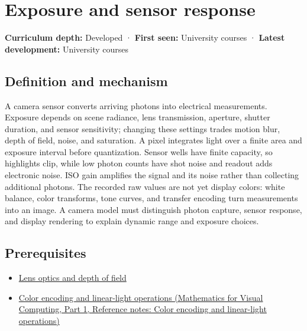 \hypertarget{appendix-92d45cdf2afc}{}\label{referencestart:appendix-92d45cdf2afc}
\section{Exposure and sensor response}\label{appendix-92d45cdf2afc-exposure-and-sensor-response}

\hypertarget{appendix-92d45cdf2afc-exposure-and-sensor-response}{}

\textbf{Curriculum depth:} Developed · \textbf{First seen:} University courses · \textbf{Latest development:} University courses

\begin{allmightroledefinition}

\subsection{Definition and mechanism}\label{appendix-92d45cdf2afc-definition-and-mechanism}

\hypertarget{appendix-92d45cdf2afc-definition-and-mechanism}{}

A camera sensor converts arriving photons into electrical measurements. Exposure depends on scene radiance, lens transmission, aperture, shutter duration, and sensor sensitivity; changing these settings trades motion blur, depth of field, noise, and saturation. A pixel integrates light over a finite area and exposure interval before quantization. Sensor wells have finite capacity, so highlights clip, while low photon counts have shot noise and readout adds electronic noise. ISO gain amplifies the signal and its noise rather than collecting additional photons. The recorded raw values are not yet display colors: white balance, color transforms, tone curves, and transfer encoding turn measurements into an image. A camera model must distinguish photon capture, sensor response, and display rendering to explain dynamic range and exposure choices.

\end{allmightroledefinition}

\subsection{Prerequisites}\label{appendix-92d45cdf2afc-prerequisites}

\hypertarget{appendix-92d45cdf2afc-prerequisites}{}

\begin{itemize}
\tightlist
\item
  \hyperref[appendix-21f8456e2629]{Lens optics and depth of field}
\item
  \href{../02-Mathematics-for-Visual-Computing-P01/main.pdf\#nameddest=appendix-a9f83ad40792}{Color encoding and linear-light operations (Mathematics for Visual Computing, Part 1, Reference notes: Color encoding and linear-light operations)}
\end{itemize}


